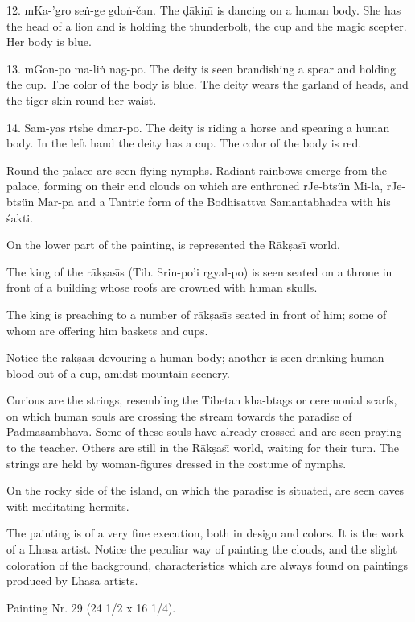 \documentclass[a4paper, 12pt, oneside]{article}
\begin{document}
12. mKa-'gro se\.{n}-ge gdo\.{n}-čan. The \d{d}\={a}ki\d{n}\={\i} is dancing on a human body. She has the head of a lion and is holding the thunderbolt, the cup and the magic scepter. Her body is blue.

13. mGon-po ma-li\.{n} nag-po. The deity is seen brandishing a spear and holding the cup. The color of the body is blue. The deity wears the garland of heads, and the tiger skin round her waist.

14. Sam-yas rtshe dmar-po. The deity is riding a horse and spearing a human body. In the left hand the deity has a cup. The color of the body is red.

Round the palace are seen flying nymphs. Radiant rainbows emerge from the palace, forming on their end clouds on which are enthroned rJe-btsün Mi-la, rJe-btsün Mar-pa and a Tantric form of the Bodhisattva Samantabhadra with his \'{s}akti.

On the lower part of the painting, is represented the R\={a}k\d{s}as\={\i} world.

The king of the r\={a}k\d{s}as\={\i}s (Tib. Srin-po'i rgyal-po) is seen seated on a throne in front of a building whose roofs are crowned with human skulls.

The king is preaching to a number of r\={a}k\d{s}as\={\i}s seated in front of him; some of whom are offering him baskets and cups.

Notice the r\={a}k\d{s}as\={\i} devouring a human body; another is seen drinking human blood out of a cup, amidst mountain scenery.

Curious are the strings, resembling the Tibetan kha-btags or ceremonial scarfs, on which human souls are crossing the stream towards the paradise of Padmasambhava. Some of these souls have already crossed and are seen praying to the teacher. Others are still in the R\={a}k\d{s}as\={\i} world, waiting for their turn. The strings are held by woman-figures dressed in the costume of nymphs.

On the rocky side of the island, on which the paradise is situated, are seen caves with meditating hermits.

The painting is of a very fine execution, both in design and colors. It is the work of a Lhasa artist. Notice the peculiar way of painting the clouds, and the slight coloration of the background, characteristics which are always found on paintings produced by Lhasa artists.

\bigskip

Painting Nr. 29 (24 1/2 x 16 1/4).
\end{document}
